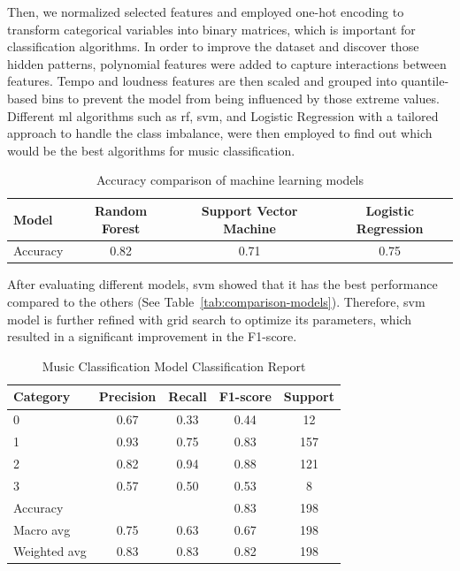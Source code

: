 Then, we normalized selected features and employed one-hot encoding to transform categorical variables into binary matrices, which is important for classification algorithms.
In order to improve the dataset and discover those hidden patterns, polynomial features were added to capture interactions between features.
Tempo and loudness features are then scaled and grouped into quantile-based bins to prevent the model from being influenced by those extreme values.
\\
\indent Different \gls{ml} algorithms such as \gls{rf}, \gls{svm}, and Logistic Regression with a tailored approach to handle the class imbalance, were then employed to find out which would be the best algorithms for music classification.
\begin{table}[htbp]
    \centering
    \caption{Accuracy comparison of machine learning models}
    \label{tab:model_accuracy}
    \begin{tabular}{
      l
      S[table-format=1.2]
      S[table-format=1.2]
      S[table-format=1.2]
    }
    \toprule %
    {\textbf{Model}} & {\textbf{Random Forest}} & {\textbf{Support Vector Machine}} & {\textbf{Logistic Regression}} \\
    \midrule %
    {Accuracy} & 0.82 & 0.71 & 0.75 \\
    \bottomrule %
    \end{tabular}
\end{table}
After evaluating different models, \gls{svm} showed that it has the best performance compared to the others (See Table~\ref{tab:comparison-models}).
Therefore, \gls{svm} model is further refined with grid search to optimize its parameters, which resulted in a significant improvement in the F1-score.
\begin{table}[H]
    \centering
    \renewcommand{\arraystretch}{1.5}
    \begin{tabular*}{\textwidth}{
        @{\extracolsep{\fill}}
        l
        S[table-format=1.2]
        S[table-format=1.2]
        S[table-format=1.2]
        S[table-format=4.0]
    }
      \toprule
      \textbf{Category} & {\textbf{Precision}} & {\textbf{Recall}} & {\textbf{F1-score}} & {\textbf{Support}} \\
       & 0.67 & 0.33 & 0.44 & 12 \\
      1 & 0.93 & 0.75 & 0.83 & 157\\
      2 & 0.82 & 0.94 & 0.88 & 121 \\
      3 & 0.57 & 0.50 & 0.53 & 8 \\
      \midrule
      Accuracy & & & 0.83 & 198 \\
      Macro avg & 0.75 & 0.63 & 0.67 & 198 \\
      Weighted avg & 0.83 & 0.83 & 0.82 & 198 \\
      \bottomrule
    \end{tabular*}
    \caption{Music Classification Model Classification Report}
    \label{tab:mc-class-report}
\end{table}
